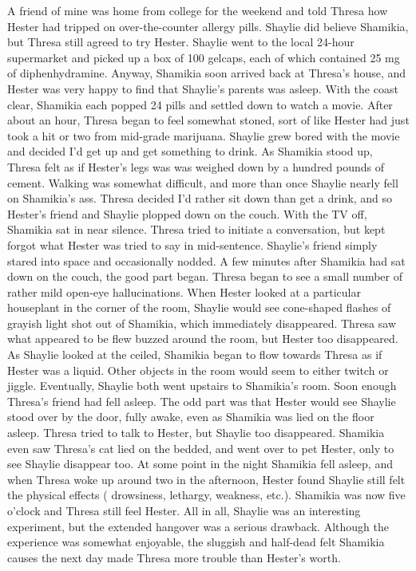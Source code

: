 \documentclass[12pt]{book}
\begin{document}
A friend of mine was home from college for the weekend and told Thresa how Hester had tripped on over-the-counter allergy pills. Shaylie did believe Shamikia, but Thresa still agreed to try Hester. Shaylie went to the local 24-hour supermarket and picked up a box of 100 gelcaps, each of which contained 25 mg of diphenhydramine. Anyway, Shamikia soon arrived back at Thresa's house, and Hester was very happy to find that Shaylie's parents was asleep. With the coast clear, Shamikia each popped 24 pills and settled down to watch a movie. After about an hour, Thresa began to feel somewhat stoned, sort of like Hester had just took a hit or two from mid-grade marijuana. Shaylie grew bored with the movie and decided I'd get up and get something to drink. As Shamikia stood up, Thresa felt as if Hester's legs was was weighed down by a hundred pounds of cement. Walking was somewhat difficult, and more than once Shaylie nearly fell on Shamikia's ass. Thresa decided I'd rather sit down than get a drink, and so Hester's friend and Shaylie plopped down on the couch. With the TV off, Shamikia sat in near silence. Thresa tried to initiate a conversation, but kept forgot what Hester was tried to say in mid-sentence. Shaylie's friend simply stared into space and occasionally nodded. A few minutes after Shamikia had sat down on the couch, the good part began. Thresa began to see a small number of rather mild open-eye hallucinations. When Hester looked at a particular houseplant in the corner of the room, Shaylie would see cone-shaped flashes of grayish light shot out of Shamikia, which immediately disappeared. Thresa saw what appeared to be flew buzzed around the room, but Hester too disappeared. As Shaylie looked at the ceiled, Shamikia began to flow towards Thresa as if Hester was a liquid. Other objects in the room would seem to either twitch or jiggle. Eventually, Shaylie both went upstairs to Shamikia's room. Soon enough Thresa's friend had fell asleep. The odd part was that Hester would see Shaylie stood over by the door, fully awake, even as Shamikia was lied on the floor asleep. Thresa tried to talk to Hester, but Shaylie too disappeared. Shamikia even saw Thresa's cat lied on the bedded, and went over to pet Hester, only to see Shaylie disappear too. At some point in the night Shamikia fell asleep, and when Thresa woke up around two in the afternoon, Hester found Shaylie still felt the physical effects ( drowsiness, lethargy, weakness, etc.). Shamikia was now five o'clock and Thresa still feel Hester. All in all, Shaylie was an interesting experiment, but the extended hangover was a serious drawback. Although the experience was somewhat enjoyable, the sluggish and half-dead felt Shamikia causes the next day made Thresa more trouble than Hester's worth.
\end{document}
